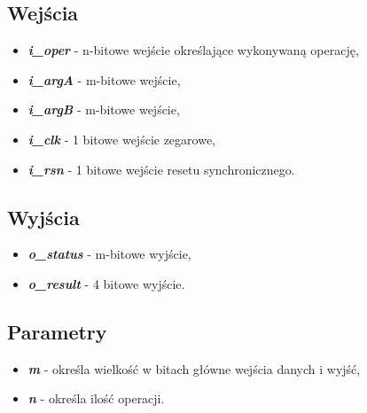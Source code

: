 \subsection{Wejścia}
\begin{itemize}
	\item \emph{\textbf{i\_oper}} - n-bitowe wejście określające wykonywaną operację,
	\item \emph{\textbf{i\_argA}} - m-bitowe wejście,
	\item \emph{\textbf{i\_argB}} - m-bitowe wejście,
	\item \emph{\textbf{i\_clk}} - 1 bitowe wejście zegarowe,
	\item \emph{\textbf{i\_rsn}} - 1 bitowe wejście resetu synchronicznego.
\end{itemize}

\subsection{Wyjścia}
\begin{itemize}
	\item \emph{\textbf{o\_status}} - m-bitowe wyjście,
	\item \emph{\textbf{o\_result}} - 4 bitowe wyjście.
\end{itemize}

\subsection{Parametry}
\begin{itemize}
	\item \emph{\textbf{m}} - określa wielkość w bitach główne wejścia danych i wyjść,
	\item \emph{\textbf{n}} - określa ilość operacji.
\end{itemize}